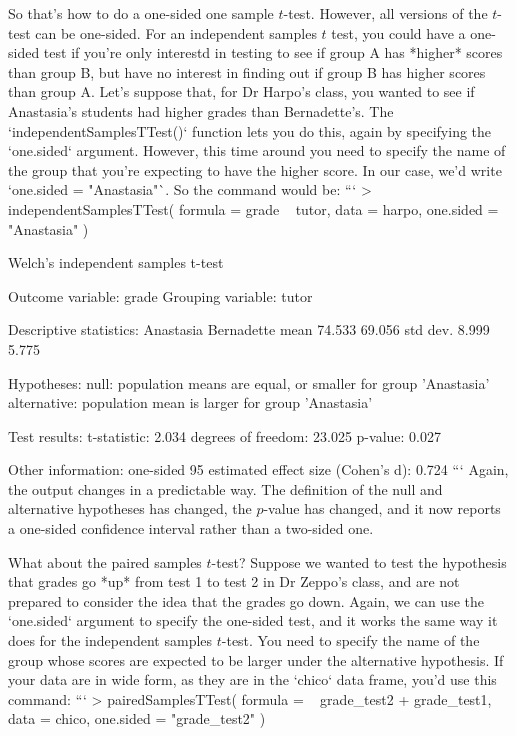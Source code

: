 So that's how to do a one-sided one sample $t$-test. However, all versions of the $t$-test can be one-sided. For an independent samples $t$ test, you could have a one-sided test if you're only interestd in testing to see if group A has *higher* scores than group B, but have no interest in finding out if group B has higher scores than group A. Let's suppose that, for Dr Harpo's class, you wanted to see if Anastasia's students had higher grades than Bernadette's. The `independentSamplesTTest()` function lets you do this, again by specifying the `one.sided` argument. However, this time around you need to specify the name of the group that you're expecting to have the higher score. In our case, we'd write `one.sided = "Anastasia"`. So the command would be:
```
> independentSamplesTTest( 
    formula = grade ~ tutor, 
    data = harpo, 
    one.sided = "Anastasia"
  )

   Welch's independent samples t-test 

Outcome variable:   grade 
Grouping variable:  tutor 

Descriptive statistics: 
            Anastasia Bernadette
   mean        74.533     69.056
   std dev.     8.999      5.775

Hypotheses: 
   null:        population means are equal, or smaller for group 'Anastasia' 
   alternative: population mean is larger for group 'Anastasia' 

Test results: 
   t-statistic:  2.034 
   degrees of freedom:  23.025 
   p-value:  0.027 

Other information: 
   one-sided 95%
   estimated effect size (Cohen's d):  0.724 
```
Again, the output changes in a predictable way. The definition of the null and alternative hypotheses has changed, the $p$-value has changed, and it now reports a one-sided confidence interval rather than a two-sided one.

What about the paired samples $t$-test? Suppose we wanted to test the hypothesis that grades go *up* from test 1 to test 2 in Dr Zeppo's class, and are not prepared to consider the idea that the grades go down. Again, we can use the `one.sided` argument to specify the one-sided test, and it works the same way it does for the independent samples $t$-test. You need to specify the name of the group whose scores are expected to be larger under the alternative hypothesis. If your data are in wide form, as they are in the `chico` data frame, you'd use this command:
```
> pairedSamplesTTest( 
     formula = ~ grade_test2 + grade_test1, 
     data = chico, 
     one.sided = "grade_test2" 
  )

